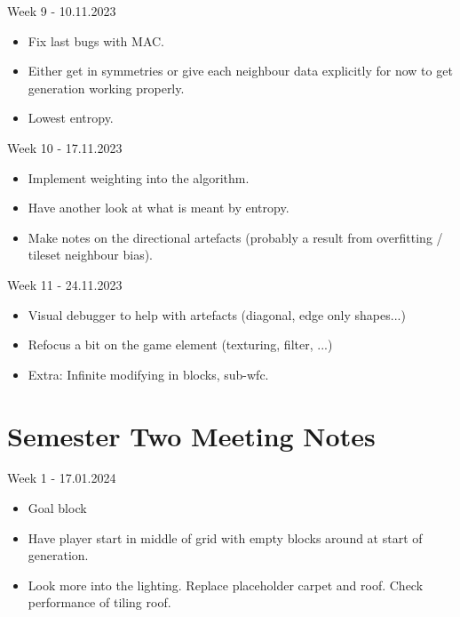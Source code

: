 \noindent Week 9 - 10.11.2023
\begin{itemize}
    \item Fix last bugs with MAC.
    \item Either get in symmetries or give each neighbour data explicitly for now to get generation working properly.
    \item Lowest entropy.
\end{itemize}

\noindent Week 10 - 17.11.2023
\begin{itemize}
    \item Implement weighting into the algorithm.
    \item Have another look at what is meant by entropy.
    \item Make notes on the directional artefacts (probably a result from overfitting / tileset neighbour bias).
\end{itemize}

\noindent Week 11 - 24.11.2023
\begin{itemize}
    \item Visual debugger to help with artefacts (diagonal, edge only shapes...)
    \item Refocus a bit on the game element (texturing, filter, ...)
    \item Extra: Infinite modifying in blocks, sub-wfc.
\end{itemize}

\section{Semester Two Meeting Notes}
\label{sec:semester_two_meeting_notes}
\noindent Week 1 - 17.01.2024
\begin{itemize}
    \item Goal block
    \item Have player start in middle of grid with empty blocks around at start of generation.
    \item Look more into the lighting. Replace placeholder carpet and roof. Check performance of tiling roof.
\end{itemize}

